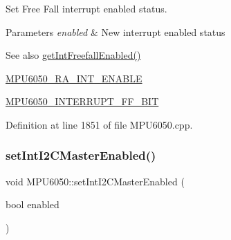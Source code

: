 Set Free Fall interrupt enabled status. 
\begin{DoxyParams}{Parameters}
{\em enabled} & New interrupt enabled status \\
\hline
\end{DoxyParams}
\begin{DoxySeeAlso}{See also}
\mbox{\hyperlink{classMPU6050_a500bb2df2e46eaecd3fb2ba7304a5ed3}{get\+Int\+Freefall\+Enabled()}} 

\mbox{\hyperlink{MPU6050_8h_a1de9d9557aa7420c746721999df4a377}{M\+P\+U6050\+\_\+\+R\+A\+\_\+\+I\+N\+T\+\_\+\+E\+N\+A\+B\+LE}} 

\mbox{\hyperlink{MPU6050_8h_a95b5ee3f5f796515c31f0b59f9ce0019}{M\+P\+U6050\+\_\+\+I\+N\+T\+E\+R\+R\+U\+P\+T\+\_\+\+F\+F\+\_\+\+B\+IT}} 
\end{DoxySeeAlso}


Definition at line 1851 of file M\+P\+U6050.\+cpp.


\begin{DoxyCode}{0}

\end{DoxyCode}
\mbox{\label{classMPU6050_af238656844a3727fa96a8d434b55473e}} 
\subsubsection{\texorpdfstring{setIntI2CMasterEnabled()}{setIntI2CMasterEnabled()}}
{\footnotesize\ttfamily void M\+P\+U6050\+::set\+Int\+I2\+C\+Master\+Enabled (\begin{DoxyParamCaption}\item[{bool}]{enabled }\end{DoxyParamCaption})}

